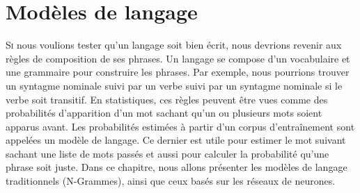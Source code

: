 \documentclass{KodeBook}
\begin{document}
		\mainmatter
	
\fi
\chapter{Modèles de langage}

\begin{introduction}
	\lettrine{S}{i} nous voulions tester qu'un langage soit bien écrit, nous devrions revenir aux règles de composition de ses phrases.
	Un langage se compose d'un vocabulaire et une grammaire pour construire les phrases.
	Par exemple, nous pourrions trouver un syntagme nominale suivi par un verbe suivi par un syntagme nominale si le verbe soit transitif.
	En statistiques, ces règles peuvent être vues comme des probabilités d'apparition d'un mot sachant qu'un ou plusieurs mots soient apparus avant. 
	Les probabilités estimées à partir d'un corpus d'entraînement sont appelées un modèle de langage. 
	Ce dernier est utile pour estimer le mot suivant sachant une liste de mots passés et aussi pour calculer la probabilité qu'une phrase soit juste.
	Dans ce chapitre, nous allons présenter les modèles de langage traditionnels (N-Grammes), ainsi que ceux basés sur les réseaux de neurones.
\end{introduction} 
\end{document}
